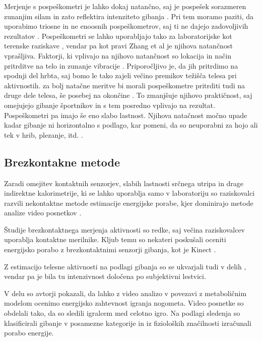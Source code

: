 Merjenje s pospeškometri je lahko dokaj natančno, saj je pospešek sorazmeren zunanjim silam in zato reflektira intenziteto gibanja \cite{yang2010review}. Pri tem moramo paziti, da uporabimo triosne in ne enoosnih pospeškometrov, saj ti ne dajejo zadovoljivih rezultatov \cite{levine2005measurement}. Pospeškometri se lahko uporabljajo tako za laboratorijske kot terenske raziskave \cite{yang2014sleep}, vendar pa kot pravi Zhang et al \cite{zhang2004improving} je njihova natančnost vprašljiva. Faktorji, ki vplivajo na njihovo natančnost so lokacija in način pritrditve na telo in zunanje vibracije \cite{yang2010review}. Priporočljivo je, da jih pritrdimo na spodnji del hrbta, saj bomo le tako zajeli večino premikov težišča telesa pri aktivnostih. za bolj natačne meritve bi morali pospeškometre pritrditi tudi na druge dele telesa, še posebej na okončine \cite{yang2010review}. To zmanjšuje njihovo praktičnost, saj omejujejo gibanje športnikov in s tem posredno vplivajo na rezultat. Pospeškometri pa imajo še eno slabo lastnost. Njihova natačnost močno upade kadar gibanje ni horizontalno s podlago, kar pomeni, da so neuporabni za hojo ali tek v hrib, plezanje, itd. \cite{yang2010review}. 

\subsection{Brezkontakne metode}
Zaradi omejitev kontaktnih senzorjev, slabih lastnosti srčnega utripa in drage indirektne kalorimetrije, ki se lahko uporablja samo v laboratoriju so raziskovalci razvili nekontaktne metode estimacije energijske porabe, kjer dominirajo metode analize video posnetkov \cite{botton2011energy,osgnach2010energy,silva2015assessing,peker2004framework,nathan2015estimating}.

Študije brezkontaktnega merjenja aktivnosti so redke, saj večina raziskovalcev uporablja kontaktne merilnike. Kljub temu so nekateri poskušali oceniti energijsko porabo z brezkontaktnimi senzorji gibanja, kot je Kinect \cite{nathan2015estimating}. 

Z estimacijo telesne aktivnosti na podlagi gibanja so se ukvarjali tudi v delih \cite{silva2015assessing,peker2004framework}, vendar pa je bila tu intenzivnost določena po subjektivni lestvici.

V delu \cite{osgnach2010energy} so avtorji pokazali, da lahko z video analizo v povezavi z metaboličnim modelom ocenimo energijsko zahtevnost igranja nogometa. Video posnetke so obdelali tako, da so sledili igralcem med celotno igro. Na podlagi sledenja so klasificirali gibanje v posamezne kategorije in iz fizioloških značilnosti izračunali porabo energije.

